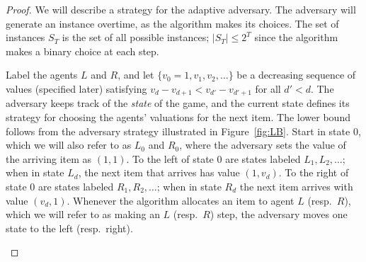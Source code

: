 \begin{proof}
We will describe a strategy for the adaptive adversary. The adversary will generate an instance overtime, as the algorithm makes its choices. The set of instances $S_T$ is the set of all possible instances; $|S_T|  \leq 2^T$ since the algorithm makes a binary choice at each step.

Label the agents $L$ and $R$, and let $\{v_0 = 1,v_1,v_2,\ldots\}$ be a decreasing sequence of values (specified later) satisfying $v_{d} - v_{d+1} < v_{d'} - v_{d'+1}$ for all $d' < d$. The adversary keeps track of the \emph{state} of the game, and the current state defines its strategy for choosing the agents' valuations for the next item. The lower bound follows from the adversary strategy illustrated in Figure~\ref{fig:LB}. Start in state $0$, which we will also refer to as $L_0$ and $R_0$, where the adversary sets the value of the arriving item as $(1,1)$. To the left of state $0$ are states labeled $L_1,L_2,\ldots$; when in state $L_d$, the next item that arrives has value $(1,v_d)$. 
To the right of state $0$ are states labeled $R_1,R_2,\ldots$; when in state $R_d$ the next item  arrives with value $(v_d,1)$. Whenever the algorithm allocates an item to agent $L$ (resp.\ $R$), which we will refer to as making an $L$ (resp.\ $R$) step, the adversary moves one state to the left (resp.\ right).

\begin{figure}[b]
        \centering
	\begin{tikzpicture}[->,>=stealth,auto,node distance=2cm,
    thick,every node/.style={circle,draw,font=\sffamily,minimum size=3em,inner sep=1}]


\end{tikzpicture}
\end{figure}
\end{proof}

